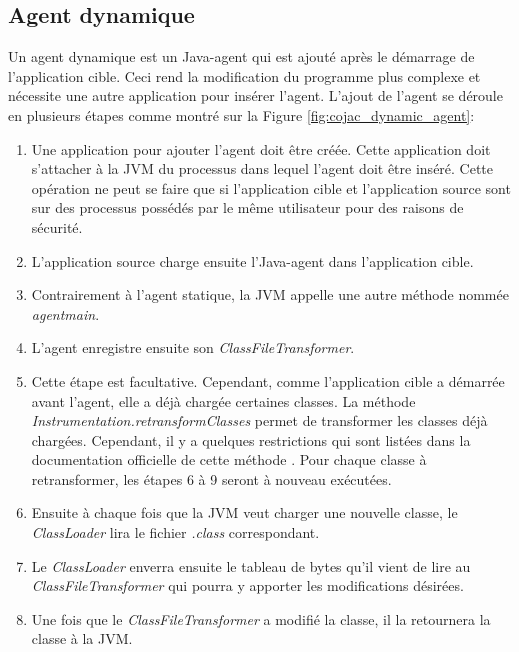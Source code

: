 \subsection{Agent dynamique}

Un agent dynamique est un \gls{Java-agent} qui est ajouté après le démarrage de l'application cible. Ceci rend la modification du programme plus complexe et nécessite une autre application pour insérer l'agent. L'ajout de l'agent se déroule en plusieurs étapes comme montré sur la Figure \ref{fig:cojac_dynamic_agent}:

\begin{enumerate}
    \item Une application pour ajouter l'agent doit être créée. Cette application doit s'attacher à la \gls{JVM} du processus dans lequel l'agent doit être inséré. Cette opération ne peut se faire que si l'application cible et l'application source sont sur des processus possédés par le même utilisateur pour des raisons de sécurité.
    \item L'application source charge ensuite l'\gls{Java-agent} dans l'application cible.
    \item Contrairement à l'agent statique, la \gls{JVM} appelle une autre méthode nommée \textit{agentmain}.
    \item L'agent enregistre ensuite son \textit{ClassFileTransformer}.
    \item Cette étape est facultative. Cependant, comme l'application cible a démarrée avant l'agent, elle a déjà chargée certaines classes. La méthode \textit{Instrumentation.\hspace{0pt}retransformClasses} permet de transformer les classes déjà chargées. Cependant, il y a quelques restrictions qui sont listées dans la documentation officielle de cette méthode \cite{java-instrumentation-retransform-documentation}. Pour chaque classe à retransformer, les étapes 6 à 9 seront à nouveau exécutées.
    \item Ensuite à chaque fois que la \gls{JVM} veut charger une nouvelle classe, le \textit{ClassLoader} lira le fichier \textit{.class} correspondant.
    \item Le \textit{ClassLoader} enverra ensuite le tableau de bytes qu'il vient de lire au \textit{ClassFileTransformer} qui pourra y apporter les modifications désirées.
    \item Une fois que le \textit{ClassFileTransformer} a modifié la classe, il la retournera la classe à la \gls{JVM}.
\end{enumerate}


